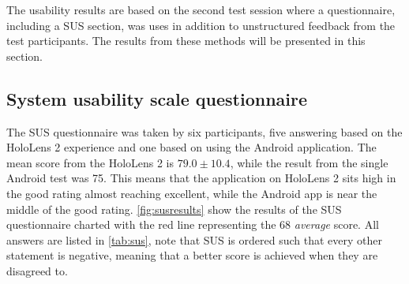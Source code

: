 The usability results are based on the second test session where a questionnaire, including a SUS section, was uses in addition to unstructured feedback from the test participants. The results from these methods will be presented in this section. 

\subsection{System usability scale questionnaire}
 
The SUS questionnaire was taken by six participants, five answering based on the HoloLens 2 experience and one based on using the Android application. The mean score from the HoloLens 2 is $79.0 \pm 10.4$, while the result from the single Android test was 75. This means that the application on HoloLens 2 sits high in the good rating almost reaching excellent, while the Android app is near the middle of the good rating. \autoref{fig:susresults} show the results of the SUS questionnaire charted with the red line representing the 68 \textit{average} score. All answers are listed in \autoref{tab:sus}, note that SUS is ordered such that every other statement is negative, meaning that a better score is achieved when they are disagreed to.

